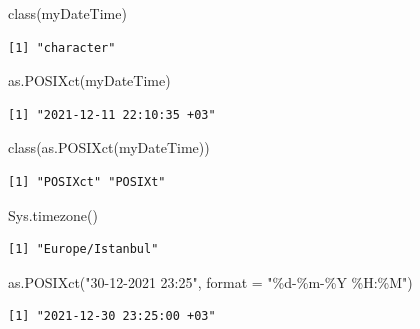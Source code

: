 \documentclass[
  letterpaper,
  DIV=11,
  numbers=noendperiod]{scrreprt}
\newenvironment{Shaded}{\begin{snugshade}}{\end{snugshade}}
\newcommand{\AttributeTok}[1]{\textcolor[rgb]{0.40,0.45,0.13}{#1}}
\newcommand{\FunctionTok}[1]{\textcolor[rgb]{0.28,0.35,0.67}{#1}}
\newcommand{\NormalTok}[1]{\textcolor[rgb]{0.00,0.23,0.31}{#1}}
\newcommand{\StringTok}[1]{\textcolor[rgb]{0.13,0.47,0.30}{#1}}
\begin{document}
\begin{Shaded}
\begin{Highlighting}[]
\FunctionTok{class}\NormalTok{(myDateTime)}
\end{Highlighting}
\end{Shaded}

\begin{verbatim}
[1] "character"
\end{verbatim}

\begin{Shaded}
\begin{Highlighting}[]
\FunctionTok{as.POSIXct}\NormalTok{(myDateTime)}
\end{Highlighting}
\end{Shaded}

\begin{verbatim}
[1] "2021-12-11 22:10:35 +03"
\end{verbatim}

\begin{Shaded}
\begin{Highlighting}[]
\FunctionTok{class}\NormalTok{(}\FunctionTok{as.POSIXct}\NormalTok{(myDateTime))}
\end{Highlighting}
\end{Shaded}

\begin{verbatim}
[1] "POSIXct" "POSIXt" 
\end{verbatim}

\begin{Shaded}
\begin{Highlighting}[]
\FunctionTok{Sys.timezone}\NormalTok{()}
\end{Highlighting}
\end{Shaded}

\begin{verbatim}
[1] "Europe/Istanbul"
\end{verbatim}

\begin{Shaded}
\begin{Highlighting}[]
\FunctionTok{as.POSIXct}\NormalTok{(}\StringTok{"30{-}12{-}2021 23:25"}\NormalTok{, }\AttributeTok{format =} \StringTok{"\%d{-}\%m{-}\%Y \%H:\%M"}\NormalTok{)}
\end{Highlighting}
\end{Shaded}

\begin{verbatim}
[1] "2021-12-30 23:25:00 +03"
\end{verbatim}
\end{document}
